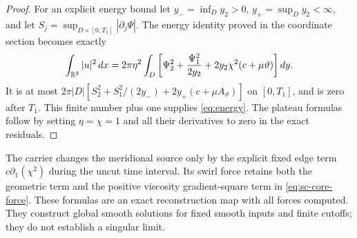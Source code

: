 \begin{proof}
For an explicit energy bound let
$y_- =\inf_D y_2>0$, $y_+=\sup_D y_2<\infty$, and let
$S_j=\sup_{D\times[0,T_1]}|\partial_j\Psi|$.
The energy identity proved in the coordinate section becomes exactly
\[
 \int_{\mathbb R^3}|u|^2\,dx
 =2\pi\eta^2\int_D
 \left[\Psi_2^2+\frac{\Psi_1^2}{2y_2}
                    +2y_2\chi^2(c+\mu\vartheta)\right]dy.
\]
It is at most
$2\pi |D|[S_2^2+S_1^2/(2y_-)+2y_+(c+\mu A_\vartheta)]$
on $[0,T_1]$, and is zero after $T_1$. This finite number plus one
supplies \eqref{eq:energy}. The plateau formulas follow by setting
$\eta=\chi=1$ and all their derivatives to zero in the exact residuals.
\end{proof}

The carrier changes the meridional source only by the explicit fixed
edge term $c\partial_1(\chi^2)$ during the uncut time interval.
Its swirl force retains both the geometric term and the positive
viscosity gradient-square term in \eqref{eq:sc-core-force}.
These formulas are an exact reconstruction map with all forces
computed. They construct global smooth solutions for fixed smooth
inputs and finite cutoffs; they do not establish a singular limit.
